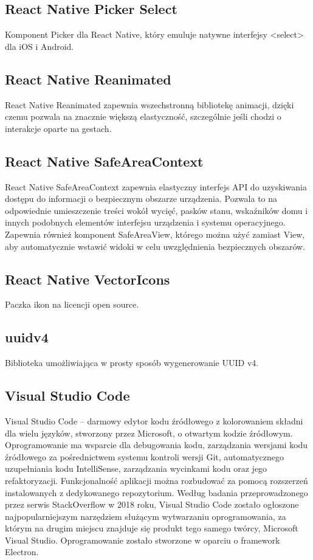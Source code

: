 \documentclass[12pt,a4paper]{article}
\begin{document}
		\subsection{React Native Picker Select}
			\indent Komponent Picker dla React Native, który emuluje natywne interfejsy <select> dla iOS i Android.
		\subsection{React Native Reanimated}
			\indent React Native Reanimated zapewnia wszechstronną bibliotekę animacji, dzięki czemu pozwala na znacznie większą elastyczność, szczególnie
			jeśli chodzi o interakcje oparte na gestach.
		\subsection{React Native SafeAreaContext}
			\indent React Native SafeAreaContext zapewnia elastyczny interfejs API do uzyskiwania dostępu do informacji o bezpiecznym obszarze urządzenia.
			Pozwala to na odpowiednie umieszczenie treści wokół wycięć, pasków stanu, wskaźników domu i innych podobnych elementów interfejsu urządzenia i systemu operacyjnego.
			Zapewnia również komponent SafeAreaView, którego można użyć zamiast View, aby automatycznie wstawić widoki w celu uwzględnienia bezpiecznych obszarów.
		\subsection{React Native VectorIcons}
			\indent Paczka ikon na licencji open source.
		\subsection{uuidv4}
			\indent Biblioteka umożliwiająca w prosty sposób wygenerowanie UUID v4.
		\subsection{Visual Studio Code}
			\indent Visual Studio Code – darmowy edytor kodu  źródłowego z kolorowaniem składni dla wielu języków, stworzony przez Microsoft, o otwartym kodzie  źródłowym.
			Oprogramowanie ma wsparcie dla debugowania kodu, zarządzania wersjami kodu  źródłowego za pośrednictwem systemu kontroli wersji Git,
			automatycznego uzupełniania kodu IntelliSense, zarządzania wycinkami kodu oraz jego refaktoryzacji. Funkcjonalność aplikacji można rozbudować za pomocą rozszerzeń
			instalowanych z dedykowanego repozytorium. Według badania przeprowadzonego przez serwis StackOverflow w 2018 roku, Visual Studio Code zostało ogłoszone
			najpopularniejszym narzędziem służącym wytwarzaniu oprogramowania, za którym na drugim miejscu znajduje się produkt tego samego twórcy, Microsoft Visual Studio.
			Oprogramowanie zostało stworzone w oparciu o framework Electron.
	\newpage
\end{document}

